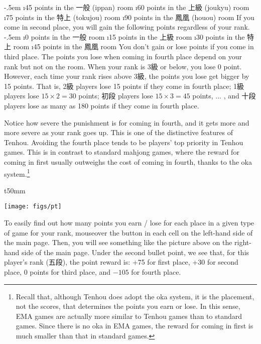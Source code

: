 \bi \itemsep-.5em
	\i 45 points in the 一般 ({\jap ippan}) room
	\i 60 points in the 上級 ({\jap joukyu}) room
	\i 75 points in the 特上 ({\jap tokujou}) room
	\i 90 points in the 鳳凰 ({\jap houou}) room
\ei
If you come in second place, you will gain the following points regardless of your rank.
	\bi \itemsep-.5em
	\i 0 points in the 一般 room
	\i 15 points in the 上級 room
	\i 30 points in the 特上 room
	\i 45 points in the 鳳凰 room
\ei
You don't gain or lose points if you come in third place. 
The points you lose when coming in fourth place depend on your rank but not on the room. When your rank is 3級 or below, you lose 0 point. However, each time your rank rises above 3級, the points you lose get bigger by 15 points. 
That is, 2級 players lose 15 points if they come in fourth place; 1級 players lose $15 \times 2 = 30$ points; 初段 players lose $15 \times 3 = 45$ points, ... , and 十段 players lose as many as 180 points if they come in fourth place.

\bigskip
Notice how severe the punishment is for coming in fourth, and it gets more and more severe as your rank goes up. This is one of the distinctive features of {\jap Tenhou}. 
Avoiding the fourth place tends to be players' top priority in {\jap Tenhou} games. This is in contrast to standard mahjong games, where the reward for coming in first usually outweighs the cost of coming in fourth, thanks to the {\jap oka} system.\footnote{Recall that, although {\jap Tenhou} does adopt the {\jap oka} system, it is the placement, not the scores, that determines the points you earn or lose. In this sense, EMA games are actually more similar to {\jap Tenhou} games than to standard games. Since there is no {\jap oka} in EMA games, the reward for coming in first is much smaller than that in standard games.} 

\bigskip

\begin{wrapfigure}{t}{50mm}
\vspace{-10pt}
\begin{center}
\texttt{[image: figs/pt]}
\end{center}
\vspace{-20pt}
\end{wrapfigure}
To easily find out how many points you earn / lose for each place in a given type of game for your rank, mouseover the  button in each cell on the left-hand side of the main page. Then, you will see something like the picture above on the right-hand side of the main page. Under the second bullet point, we see that, for this player's rank (五段), the point reward is: +75 for first place, +30 for second place, 0 points for third place, and $-105$ for fourth place. 


